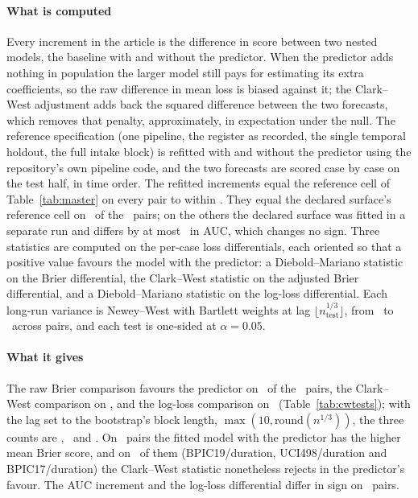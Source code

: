 \paragraph{What is computed}
Every increment in the article is the difference in score between two nested
models, the baseline with and without the predictor. When the predictor adds
nothing in population the larger model still pays for estimating its extra
coefficients, so the raw difference in mean loss is biased against it; the
Clark--West adjustment adds back the squared difference between the two
forecasts, which removes that penalty, approximately, in expectation under the
null. The
reference specification (one pipeline, the register as recorded, the single
temporal holdout, the full intake block) is refitted with and without the
predictor using the repository's own pipeline code, and the two forecasts are
scored case by case on the test half, in time order. The refitted increments
equal the reference cell of Table~\ref{tab:master} on every pair to within
. They equal the declared surface's reference cell on
\nExactDeclaredAuc\ of the \nPairs\ pairs; on the others the declared surface
was fitted in a separate run and differs by at most \ in
AUC, which changes no sign. Three statistics are computed on the per-case
loss differentials, each oriented so that a positive value favours the model
with the predictor: a Diebold--Mariano statistic on the Brier differential, the
Clark--West statistic on the adjusted Brier differential, and a
Diebold--Mariano statistic on the log-loss differential. Each long-run
variance is Newey--West with Bartlett weights at lag
$\lfloor n_{\mathrm{test}}^{1/3} \rfloor$, from \cwLagMin\ to \cwLagMax\ across
pairs, and each test is one-sided at $\alpha = 0.05$.



\paragraph{What it gives}
The raw Brier comparison favours the predictor on \nRejectDmBrier\ of the
\nPairs\ pairs, the Clark--West comparison on \nRejectCw, and the log-loss
comparison on \nRejectDmLogloss\ (Table~\ref{tab:cwtests}); with the lag set
to the bootstrap's block length, $\max(10, \mathrm{round}(n^{1/3}))$, the
three counts are \nRejectDmBrierAlt, \nRejectCwAlt\ and \nRejectDmLoglossAlt.
On \nBrierWorseReference\ pairs the fitted model with the predictor has the
higher mean Brier score, and on \nCwReverses\ of them (BPIC19/duration,
UCI498/duration and BPIC17/duration) the Clark--West statistic nonetheless
rejects in the predictor's favour. The AUC increment and the log-loss
differential differ in sign on \nAucLoglossSignDiffer\ pairs.

